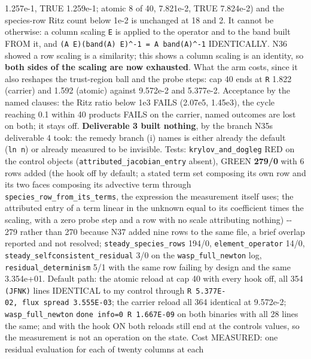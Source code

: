 \documentclass[english,a4paper]{my_memo}
\begin{document}
\begin{itemize}
  1.257e-1, TRUE 1.259e-1; atomic 8 of 40, 7.821e-2, TRUE 7.824e-2) and the
  species-row Ritz count below 1e-2 is unchanged at 18 and 2. It cannot be
  otherwise: a column scaling \texttt{E} is applied to the operator and to the band
  built FROM it, and \texttt{(A\ E)(band(A)\ E)\^{}-1\ =\ A\ band(A)\^{}-1} IDENTICALLY. N36
  showed a row scaling is a similarity; this shows a column scaling is an
  identity, so \textbf{both sides of the scaling are now exhausted}. What the arm
  costs, since it also reshapes the trust-region ball and the probe steps:
  cap 40 ends at \texttt{\textbar{}\textbar{}R\textbar{}\textbar{}} 1.822 (carrier) and 1.592 (atomic) against 9.572e-2
  and 5.377e-2. Acceptance by the named clauses: the Ritz ratio below 1e3
  FAILS (2.07e5, 1.45e3), the cycle reaching 0.1 within 40 products FAILS on
  the carrier, named outcomes are lost on both; it stays off. \textbf{Deliverable 3
  built nothing}, by the branch N35\textquotesingle s deliverable 4 took: the remedy branch
  (i) names is either already the default (\texttt{ln\ n}) or already measured to be
  invisible. Tests: \texttt{krylov\_and\_dogleg} RED on the control objects
  (\texttt{attributed\_jacobian\_entry} absent), GREEN \textbf{279/0} with 6 rows added
  (the hook off by default; a stated term set composing its own row and its
  two faces composing its advective term through
  \texttt{species\_row\_from\_its\_terms}, the expression the measurement itself uses;
  the attributed entry of a term linear in the unknown equal to its
  coefficient times the scaling, with a zero probe step and a row with no
  scale attributing nothing) -\/- 279 rather than 270 because N37 added nine
  rows to the same file, a brief overlap reported and not resolved;
  \texttt{steady\_species\_rows} 194/0, \texttt{element\_operator} 14/0,
  \texttt{steady\_selfconsistent\_residual} 3/0 on the \texttt{wasp\_full\_newton} log,
  \texttt{residual\_determinism} 5/1 with the same row failing by design and the same
  3.354e+01. Default path: the atomic reload at cap 40 with every hook off,
  all 354 \texttt{(JFNK)} lines IDENTICAL to my control through \texttt{\textbar{}\textbar{}R\textbar{}\textbar{}\ 5.377E-02,\ flux\ spread\ 3.555E-03}; the carrier reload all 364 identical at 9.572e-2;
  \texttt{wasp\_full\_newton} \texttt{done\ info=0\ \textbar{}\textbar{}R\textbar{}\textbar{}\ 1.667E-09} on both binaries with all
  28 lines the same; and with the hook ON both reloads still end at the
  control\textquotesingle s values, so the measurement is not an operation on the state.
  Cost MEASURED: one residual evaluation for each of twenty columns at each

\end{itemize}
\end{document}
